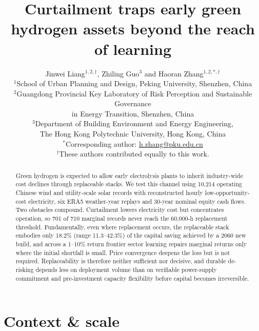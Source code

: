 \documentclass[11pt,a4paper]{article}
\begin{document}
\title{Curtailment traps early green hydrogen assets beyond the reach of learning}
\author{Jinwei Liang$^{1,2,\dagger}$, Zhiling Guo$^{3}$ and Haoran Zhang$^{1,2,*,\dagger}$\\[0.65em]
\small $^{1}$School of Urban Planning and Design, Peking University, Shenzhen, China\\
\small $^{2}$Guangdong Provincial Key Laboratory of Risk Perception and Sustainable Governance\\
\small in Energy Transition, Shenzhen, China\\
\small $^{3}$Department of Building Environment and Energy Engineering,\\
\small The Hong Kong Polytechnic University, Hong Kong, China\\[0.45em]
\small $^{*}$Corresponding author: \href{mailto:h.zhang@pku.edu.cn}{h.zhang@pku.edu.cn}\\
\small $^{\dagger}$These authors contributed equally to this work.}
\date{}

\maketitle
\linenumbers

\renewcommand{\abstractname}{Summary}
\begin{abstract}
Green hydrogen is expected to allow early electrolysis plants to inherit industry-wide cost declines through replaceable stacks. We test this channel using 10,214 operating Chinese wind and utility-scale solar records with reconstructed hourly low-opportunity-cost electricity, six ERA5 weather-year replays and 30-year nominal equity cash flows. Two obstacles compound. Curtailment lowers electricity cost but concentrates operation, so 701 of 710 marginal records never reach the 60,000-h replacement threshold. Fundamentally, even where replacement occurs, the replaceable stack embodies only 18.2\% (range 11.3--42.3\%) of the capital saving achieved by a 2060 new build, and across a 1--10\% return frontier sector learning repairs marginal returns only where the initial shortfall is small. Price convergence deepens the loss but is not required. Replaceability is therefore neither sufficient nor decisive, and durable de-risking depends less on deployment volume than on verifiable power-supply commitment and pre-investment capacity flexibility before capital becomes irreversible.
\end{abstract}

\section*{Context \& scale}
\end{document}
